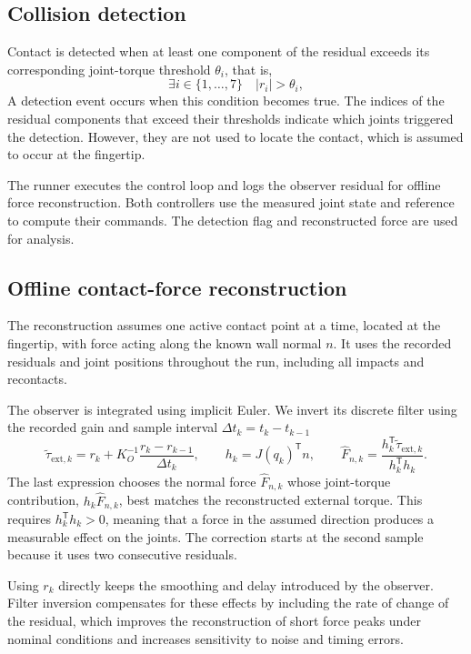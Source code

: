 \documentclass[11pt,a4paper]{article}
\begin{document}
\subsection{Collision detection}
Contact is detected when at least one component of the residual exceeds
its corresponding joint-torque threshold $\theta_i$, that is,
\begin{equation}
 \exists i\in\{1,\ldots,7\}\quad |r_i|>\theta_i ,
 \label{eq:detector}
\end{equation}
A detection event occurs when this condition becomes true. The indices
of the residual components that exceed their thresholds indicate which
joints triggered the detection. However, they are not used to locate
the contact, which is assumed to occur at the fingertip.

The runner executes the control loop and logs the observer residual for
offline force reconstruction. Both controllers use the measured joint
state and reference to compute their commands. The detection flag and
reconstructed force are used for analysis.

\subsection{Offline contact-force reconstruction}
The reconstruction assumes one active contact point at a time, located
at the fingertip, with force acting along the known wall normal $n$.
It uses the recorded residuals and joint positions throughout the run,
including all impacts and recontacts.

The observer is integrated using implicit Euler. We invert its discrete
filter using the recorded gain and sample interval
$\Delta t_k=t_k-t_{k-1}$
\begin{equation}
 \widetilde\tau_{\mathrm{ext},k}
 =r_k+K_O^{-1}\frac{r_k-r_{k-1}}{\Delta t_k},\qquad
 h_k=J(q_k)^{\mathsf T}n,\qquad
 \widehat F_{n,k}
 =\frac{h_k^{\mathsf T}\widetilde\tau_{\mathrm{ext},k}}
        {h_k^{\mathsf T}h_k}.
 \label{eq:force-estimation}
\end{equation}
The last expression chooses the normal force $\widehat F_{n,k}$ whose
joint-torque contribution, $h_k\widehat F_{n,k}$, best matches the
reconstructed external torque. This requires
$h_k^{\mathsf T}h_k>0$, meaning that a force in the assumed direction
produces a measurable effect on the joints. The correction starts at
the second sample because it uses two consecutive residuals.

Using $r_k$ directly keeps the smoothing and delay introduced by the
observer. Filter inversion compensates for these effects by including
the rate of change of the residual, which improves the reconstruction
of short force peaks under nominal conditions and increases
sensitivity to noise and timing errors.
\end{document}
